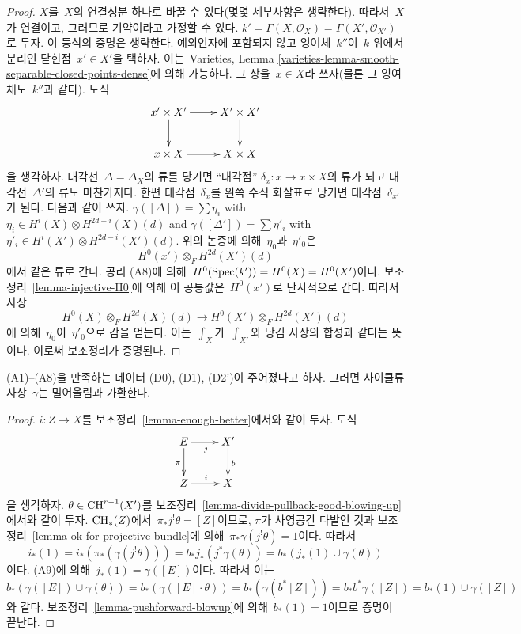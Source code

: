 \begin{proof}
$X$를\  $X$의 연결성분 하나로 바꿀 수 있다(몇몇 세부사항은 생략한다).
따라서\  $X$가 연결이고, 그러므로 기약이라고 가정할 수 있다.
$k' = \Gamma(X, \mathcal{O}_X) = \Gamma(X', \mathcal{O}_{X'})$로 두자.
이 등식의 증명은 생략한다. 예외인자에 포함되지 않고 잉여체\  $k''$이\ 
$k$ 위에서 분리인 닫힌점\  $x' \in X'$을 택하자. 이는\  Varieties,
Lemma \ref{varieties-lemma-smooth-separable-closed-points-dense}에
의해 가능하다. 그 상을\  $x \in X$라 쓰자(물론 그 잉여체도\  $k''$과
같다). 도식
$$
\xymatrix{
x' \times X' \ar[r] \ar[d] & X' \times X' \ar[d] \\
x \times X \ar[r] & X \times X
}
$$
을 생각하자. 대각선\  $\Delta = \Delta_X$의 류를 당기면 “대각점”
$\delta_x : x \to x \times X$의 류가 되고 대각선\  $\Delta'$의 류도
마찬가지다. 한편 대각점\  $\delta_x$를 왼쪽 수직 화살표로 당기면
대각점\  $\delta_{x'}$가 된다. 다음과 같이 쓰자.
$\gamma([\Delta]) = \sum \eta_i$ with
$\eta_i \in H^i(X) \otimes H^{2d - i}(X)(d)$ and
$\gamma([\Delta']) = \sum \eta'_i$ with
$\eta'_i \in H^i(X') \otimes H^{2d - i}(X')(d)$.
위의 논증에 의해\  $\eta_0$과\  $\eta'_0$은
$$
H^0(x') \otimes_F H^{2d}(X')(d)
$$
에서 같은 류로 간다. 공리 (A8)에 의해\ 
$H^0(\mathop{\mathrm{Spec}}(k')) = H^0(X) = H^0(X')$이다. 보조정리\ 
\ref{lemma-injective-H0}에 의해 이 공통값은\  $H^0(x')$로 단사적으로
간다. 따라서 사상
$$
H^0(X) \otimes_F H^{2d}(X)(d)
\longrightarrow
H^0(X') \otimes_F H^{2d}(X')(d)
$$
에 의해\  $\eta_0$이\  $\eta'_0$으로 감을 얻는다. 이는\  $\int_X$가\ 
$\int_{X'}$와 당김 사상의 합성과 같다는 뜻이다. 이로써 보조정리가
증명된다.
\end{proof}

\begin{lemma}
\label{lemma-done}
(A1)--(A8)을 만족하는 데이터 (D0), (D1), (D2')이 주어졌다고 하자.
그러면 사이클류 사상\  $\gamma$는 밀어올림과 가환한다.
\end{lemma}

\begin{proof}
$i : Z \to X$를 보조정리\  \ref{lemma-enough-better}에서와 같이 두자.
도식
$$
\xymatrix{
E \ar[r]_j \ar[d]_\pi & X' \ar[d]^b \\
Z \ar[r]^i & X
}
$$
을 생각하자. $\theta \in \mathop{\mathrm{CH}}\nolimits^{r - 1}(X')$를 보조정리\ 
\ref{lemma-divide-pullback-good-blowing-up}에서와 같이 두자.
$\mathop{\mathrm{CH}}\nolimits_*(Z)$에서\  $\pi_*j^!\theta = [Z]$이므로, $\pi$가 사영공간
다발인 것과 보조정리\  \ref{lemma-ok-for-projective-bundle}에 의해\ 
$\pi_*\gamma(j^!\theta) = 1$이다. 따라서
$$
i_*(1) = i_*(\pi_*(\gamma(j^!\theta))) =
b_*j_*(j^*\gamma(\theta)) =
b_*(j_*(1) \cup \gamma(\theta))
$$
이다. (A9)에 의해\  $j_*(1) = \gamma([E])$이다. 따라서 이는
$$
b_*(\gamma([E]) \cup \gamma(\theta)) =
b_*(\gamma([E] \cdot \theta)) =
b_*(\gamma(b^*[Z])) =
b_*b^*\gamma([Z]) = b_*(1) \cup \gamma([Z])
$$
와 같다. 보조정리\  \ref{lemma-pushforward-blowup}에 의해\ 
$b_*(1) = 1$이므로 증명이 끝난다.
\end{proof}

